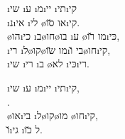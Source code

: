 \begin{twocol}
\begin{stanza}
	\i{שי} \i{ע} \i{מ}\i{יי}  \i{תי}\i{קי}\\
	\i{נ}\i{אי} \i{לי} \o{או} \u{סו}\i{קי}.\\
	 \o{הו}\i{כי} \i{ב}\o{חו}\o{בו} \i{ע} \o{מו} \u{רו}\i{כּי},\\
	\i{רי} \i{ל}\o{קו}\o{מו} \u{שו}\i{בי} \u{ו}\o{חו}\i{קי},\\
	\i{שי} \i{רי} \i{ב} \o{לא} \i{כּי}\i{רי}.
\end{stanza}

\begin{stanza}
	\i{שי} \i{ע} \i{מ}\i{יי}  \i{תי}\i{קי},\\
	     .\\
	 \o{או}\i{בי}  \i{ל}\o{קו}\o{מו} \o{חו}\i{קי},\\
	\u{ו}\i{גי} \i{ל} \u{כו}.
\end{stanza}
\end{twocol}




